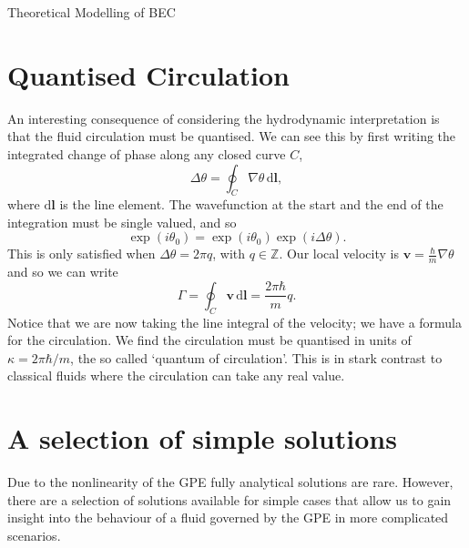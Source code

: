 \begin{chapter}{\label{cha:theoretical_model}Theoretical Modelling of BEC}
\section{\label{section:quantisedcirculation} Quantised Circulation}
An interesting consequence of considering the hydrodynamic interpretation is that the fluid circulation must be quantised. We can see this by first writing the integrated change of phase along any closed curve $C$,
\begin{equation}
	\Delta\theta = \oint_C \! \nabla \theta  \, \mathrm{d}\mathbf{l},
\end{equation}
where $\mathrm{d}\mathbf{l}$ is the line element. The wavefunction at the start and the end of the integration must be single valued, and so
\begin{equation}
	\exp (i\theta_0) = \exp (i\theta_0)\exp (i\Delta\theta).
\end{equation}
This is only satisfied when $\Delta\theta = 2\pi q$, with $q\in\mathbb{Z}$. Our local velocity is $\mathbf{v} = \frac{\hbar}{m}\nabla\theta$ and so we can write
\begin{equation}
	\Gamma = \oint_C \! \mathbf{v} \, \mathrm{d}\mathbf{l} = \frac{2 \pi \hbar}{m}q.
\end{equation}
Notice that we are now taking the line integral of the velocity; we have a formula for the circulation. We find the circulation must be quantised in units of $\kappa = 2 \pi \hbar/m$, the so called `quantum of circulation'. This is in stark contrast to classical fluids where the circulation can take any real value.

\section{\label{section:solutions} A selection of simple solutions}
	Due to the nonlinearity of the GPE fully analytical solutions are rare. However, there are a selection of solutions available for simple cases that allow us to gain insight into the behaviour of a fluid governed by the GPE in more complicated scenarios.

\end{chapter}
